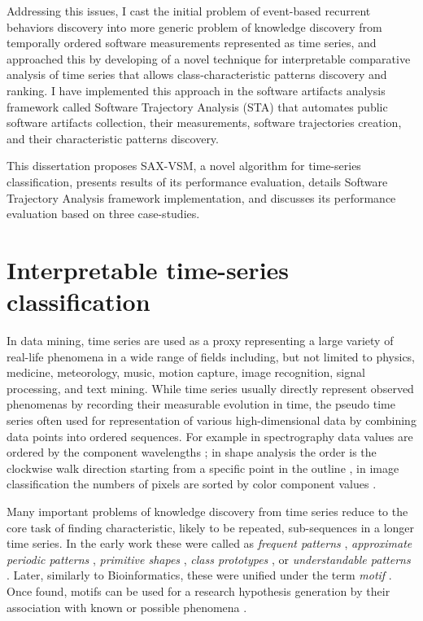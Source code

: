 Addressing this issues, I cast the initial problem of event-based recurrent behaviors discovery into more 
generic problem of knowledge discovery from temporally ordered software measurements 
represented as time series, and approached this by developing of a novel technique for interpretable 
comparative analysis of time series that allows class-characteristic patterns discovery and ranking.
I have implemented this approach in the software artifacts analysis framework called 
Software Trajectory Analysis (STA) that automates public software artifacts collection, 
their measurements, software trajectories creation, and their characteristic patterns discovery. 

This dissertation proposes SAX-VSM, a novel algorithm for time-series classification, presents
results of its performance evaluation, details Software Trajectory Analysis framework implementation, 
and discusses its performance evaluation based on three case-studies.

%
%
\section{Interpretable time-series classification}\label{section_knowledge_discovery}
In data mining, time series are used as a proxy representing a large variety of real-life phenomena 
in a wide range of fields including, but not limited to physics, medicine, meteorology, music, 
motion capture, image recognition, signal processing, and text mining. 
While time series usually directly represent observed phenomenas by recording their measurable evolution 
in time, the pseudo time series often used for representation of various high-dimensional data 
by combining data points into ordered sequences. 
For example in spectrography data values are ordered by the component wavelengths \cite{citeulike:12550833};
in shape analysis the order is the clockwise walk direction starting from a specific point in the outline 
\cite{citeulike:12550835}, in image classification the numbers of pixels are sorted by color component 
values \cite{citeulike:2900542}.

Many important problems of knowledge discovery from time series reduce to the core task of finding 
characteristic, likely to be repeated, sub-sequences in a longer time series. 
In the early work these were called as 
\textit{frequent patterns} \cite{citeulike:5159615}, 
\textit{approximate periodic patterns} \cite{citeulike:1959582},
\textit{primitive shapes} \cite{citeulike:5898869}, 
\textit{class prototypes} \cite{citeulike:4406444}, 
or \textit{understandable patterns} \cite{citeulike:3978076}. 
Later, similarly to Bioinformatics, these were unified under the term \textit{motif} \cite{citeulike:3977965}.
Once found, motifs can be used for a research hypothesis generation by their association with known
or possible phenomena \cite{citeulike:3977965}. 

